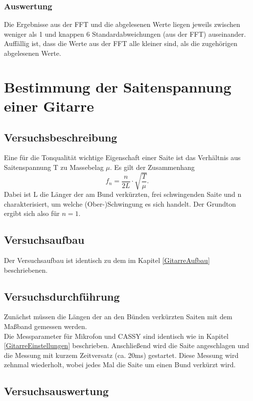 \documentclass[12pt,a4paper]{article}
\begin{document}
\subsubsection{Auswertung}
Die Ergebnisse aus der FFT und die abgelesenen Werte liegen jeweils zwischen weniger als 1 und knappen 6 Standardabweichungen (aus der FFT) auseinander. Auffällig ist, dass die Werte aus der FFT alle kleiner sind, als die zugehörigen abgelesenen Werte.
\section{Bestimmung der Saitenspannung einer Gitarre}
\subsection{Versuchsbeschreibung}
Eine für die Tonqualität wichtige Eigenschaft einer Saite ist das Verhältnis aus Saitenspannung T zu Massebelag $\mu$. Es gilt der Zusammenhang
\begin{equation}
f_n = \dfrac{n}{2L} \cdot \sqrt{\dfrac{T}{\mu}}.
\label{eq:SpannungMassebelag}
\end{equation}
Dabei ist L die Länger der am Bund verkürzten, frei schwingenden Saite und n charakterisiert, um welche (Ober-)Schwingung es sich handelt. Der Grundton ergibt sich also für $n=1$.
\subsection{Versuchsaufbau}
Der Versuchsaufbau ist identisch zu dem im Kapitel \ref{GitarreAufbau} beschriebenen.
\subsection{Versuchsdurchführung}
Zunächst müssen die Längen der an den Bünden verkürzten Saiten mit dem Maßband gemessen werden. \\
Die Messparameter für Mikrofon und CASSY sind identisch wie in Kapitel \ref{GitarreEinstellungen} beschrieben.
Anschließend wird die Saite angeschlagen und die Messung mit kurzem Zeitversatz (ca. 20ms) gestartet. Diese Messung wird zehnmal wiederholt, wobei jedes Mal die Saite um einen Bund verkürzt wird.
\subsection{Versuchsauswertung}
\end{document}
